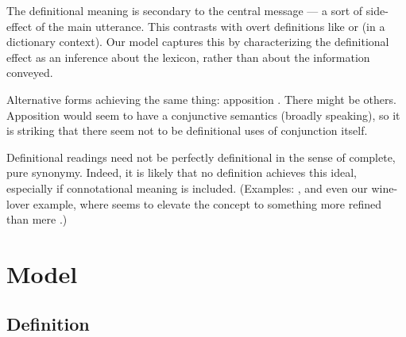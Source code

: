 \documentclass{article}
\begin{document}
\begin{examples}
\item The definitional meaning is secondary to the central message ---
  a sort of side-effect of the main utterance. This contrasts with
  overt definitions like  or
   (in a dictionary context). Our model
  captures this by characterizing the definitional effect as an
  inference about the lexicon, rather than about the information
  conveyed.
  
\item Alternative forms achieving the same thing: apposition
  . There might be others. Apposition
  would seem to have a conjunctive semantics (broadly speaking), so it
  is striking that there seem not to be definitional uses of
  conjunction itself.

\item Definitional readings need not be perfectly definitional in the
  sense of complete, pure synonymy. Indeed, it is likely that no
  definition achieves this ideal, especially if connotational meaning
  is included. (Examples: , and
  even our wine-lover example, where  seems to elevate
  the concept to something more refined than mere .)
\end{examples}


\section{Model}\label{sec:model}


\subsection{Definition}\label{sec:definition}
\end{document}
